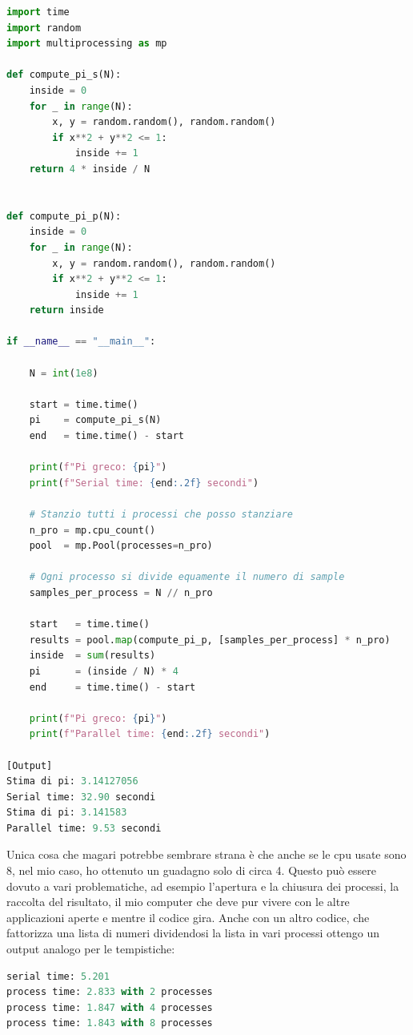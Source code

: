 \documentclass[10pt,a4paper]{article}
\begin{document}
\begin{lstlisting}[language=Python]
import time
import random
import multiprocessing as mp

def compute_pi_s(N):
    inside = 0
    for _ in range(N):
        x, y = random.random(), random.random()
        if x**2 + y**2 <= 1:
            inside += 1
    return 4 * inside / N


def compute_pi_p(N):
    inside = 0
    for _ in range(N):
        x, y = random.random(), random.random()
        if x**2 + y**2 <= 1:
            inside += 1
    return inside

if __name__ == "__main__":

    N = int(1e8)

    start = time.time()
    pi    = compute_pi_s(N)
    end   = time.time() - start

    print(f"Pi greco: {pi}")
    print(f"Serial time: {end:.2f} secondi")

    # Stanzio tutti i processi che posso stanziare
    n_pro = mp.cpu_count()
    pool  = mp.Pool(processes=n_pro)

    # Ogni processo si divide equamente il numero di sample
    samples_per_process = N // n_pro

    start   = time.time()
    results = pool.map(compute_pi_p, [samples_per_process] * n_pro)
    inside  = sum(results)
    pi      = (inside / N) * 4
    end     = time.time() - start

    print(f"Pi greco: {pi}")
    print(f"Parallel time: {end:.2f} secondi")

[Output]
Stima di pi: 3.14127056
Serial time: 32.90 secondi
Stima di pi: 3.141583
Parallel time: 9.53 secondi
\end{lstlisting}
Unica cosa che magari potrebbe sembrare strana è che anche se le cpu usate sono 8, nel mio caso, ho ottenuto un guadagno solo di circa 4. Questo può essere dovuto a vari problematiche, ad esempio l'apertura e la chiusura dei processi, la raccolta del risultato, il mio computer che deve pur vivere con le altre applicazioni aperte e mentre il codice gira. Anche con un altro codice, che fattorizza una lista di numeri dividendosi la lista in vari processi ottengo un output analogo per le tempistiche:
\begin{lstlisting}[language=Python]
serial time: 5.201
process time: 2.833 with 2 processes
process time: 1.847 with 4 processes
process time: 1.843 with 8 processes
\end{lstlisting}
\end{document}
